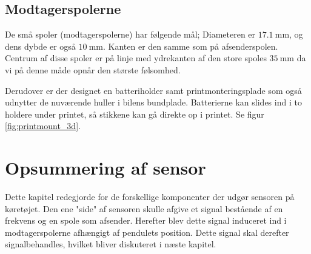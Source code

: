 \subsection{Modtagerspolerne}
De små spoler (modtagerspolerne) har følgende mål; 
Diameteren er $\SI{17.1}{\milli\meter}$, og dens dybde er også $\SI{10}{\milli\meter}$. Kanten er den samme som på afsenderspolen. Centrum af disse spoler er på linje med ydrekanten af den store spoles $\SI{35}{\milli\meter}$ da vi på denne måde opnår den største følsomhed. 

Derudover er der designet en batteriholder samt printmonteringsplade som også udnytter de nuværende huller i bilens bundplade. Batterierne kan slides ind i to holdere under printet, så stikkene kan gå direkte op i printet. Se figur \ref{fig:printmount_3d}.

\section{Opsummering af sensor}
Dette kapitel redegjorde for de forskellige komponenter der udgør sensoren på køretøjet. Den ene "side" af sensoren skulle afgive et signal bestående af en frekvens og en spole som afsender. Herefter blev dette signal induceret ind i modtagerspolerne afhængigt af pendulets position. Dette signal skal derefter signalbehandles, hvilket bliver diskuteret i næste kapitel. 